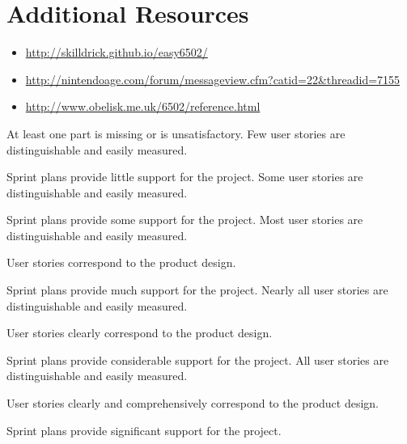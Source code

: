 \documentclass{../../fal_assignment}
\begin{document}
\section*{Additional Resources}

\begin{itemize}
    \item \url{http://skilldrick.github.io/easy6502/}
	\item \url{http://nintendoage.com/forum/messageview.cfm?catid=22&threadid=7155}
	\item \url{http://www.obelisk.me.uk/6502/reference.html}
\end{itemize}

\rubricyearthree
\begin{markingrubric}
		\grade\fail At least one part is missing or is unsatisfactory.
%
        \grade \fail Few user stories are distinguishable and easily measured.
            \par Sprint plans provide little support for the project.
        \grade Some user stories are distinguishable and easily measured.
            \par Sprint plans provide some support for the project.
        \grade Most user stories are distinguishable and easily measured.
            \par User stories correspond to the product design.
            \par Sprint plans provide much support for the project.
        \grade Nearly all user stories are distinguishable and easily measured.
            \par User stories clearly correspond to the product design.
            \par Sprint plans provide considerable support for the project.
        \grade All user stories are distinguishable and easily measured.
            \par User stories clearly and comprehensively correspond to the product design.
            \par Sprint plans provide significant support for the project.

\end{markingrubric}
\end{document}
